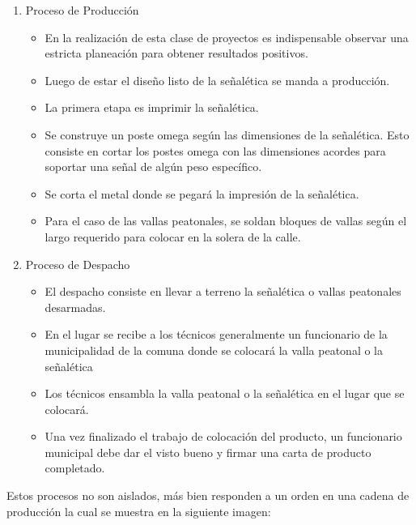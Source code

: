 \begin{enumerate}[1)]
  
\item Proceso de Producción
\begin{itemize}
\item En la realización de esta clase de proyectos es indispensable observar una estricta planeación para obtener resultados positivos. 
\item Luego de estar el diseño listo de la señalética se manda a producción.
\item La primera etapa es imprimir la señalética.
\item Se construye un poste omega según las dimensiones de la señalética. Esto consiste en cortar los postes omega con las dimensiones acordes para soportar una señal de algún peso específico.
\item Se corta el metal donde se pegará la impresión de la señalética.
\item Para el caso de las vallas peatonales, se soldan bloques de vallas según el largo requerido para colocar en la solera de la calle.
\end{itemize}

\item Proceso de Despacho
\begin{itemize}
\item El despacho consiste en llevar a terreno la señalética o vallas peatonales desarmadas.
\item En el lugar se recibe a los técnicos generalmente un funcionario de la municipalidad de la comuna donde se colocará la valla peatonal o la señalética
\item Los técnicos ensambla la valla peatonal o la señalética en el lugar que se colocará.
\item Una vez finalizado el trabajo de colocación del producto, un funcionario municipal debe dar el visto bueno y firmar una carta de producto completado.
\end{itemize}
\end{enumerate}	
	
	Estos procesos no son aislados, más bien responden a un orden en una cadena de producción la cual se muestra en la siguiente imagen:

